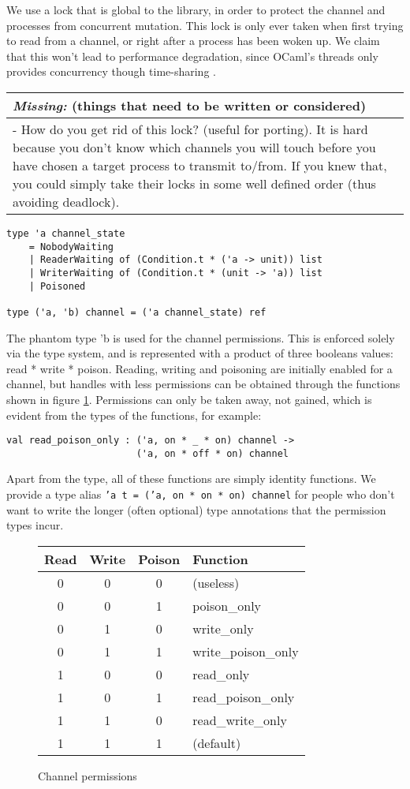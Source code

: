 \documentclass[a4paper,12pt]{article}
\newcommand{\missing}[1]{
\begin{tabular}{|p{11cm}|}
\hline
\emph{Missing:} {\scriptsize (things that need to be written or considered)} \\
\hline
#1
\hline
\end{tabular}
}
\begin{document}
We use a lock that is global to the library, in order to protect the channel and processes from
concurrent mutation. This lock is only ever taken when first trying to read from a channel, or
right after a process has been woken up. We claim that this won't lead to performance degradation,
since OCaml's threads only provides concurrency though time-sharing \cite{ocaml-threads}.

\missing{
- How do you get rid of this lock? (useful for porting). It is hard because you don't know which
channels you will touch before you have chosen a target process to transmit to/from. If you knew
that, you could simply take their locks in some well defined order (thus avoiding deadlock). \\
}

\begin{verbatim}
type 'a channel_state
    = NobodyWaiting 
    | ReaderWaiting of (Condition.t * ('a -> unit)) list
    | WriterWaiting of (Condition.t * (unit -> 'a)) list
    | Poisoned

type ('a, 'b) channel = ('a channel_state) ref
\end{verbatim}

The phantom type 'b is used for the channel permissions. This is enforced solely via the type
system, and is represented with a product of three booleans values: read * write * poison.
Reading, writing and poisoning are initially enabled for a channel, but handles with less 
permissions can be obtained through the functions shown in figure \ref{channel-permissions}. 
Permissions can only be taken away, not gained, which is evident from the types of the 
functions, for example: 

\begin{verbatim}
val read_poison_only : ('a, on * _ * on) channel -> 
                       ('a, on * off * on) channel
\end{verbatim}

Apart from the type, all of these functions are simply identity functions. We provide a
type alias \texttt{'a t = ('a, on * on * on) channel} for people who don't want to write the
longer (often optional) type annotations that the permission types incur.

\begin{figure}[h]
\centering
\begin{tabular}{c|c|c|l}
Read & Write & Poison & Function \\
\hline
0 & 0 & 0 & (useless) \\
0 & 0 & 1 & poison\_only \\
0 & 1 & 0 & write\_only \\
0 & 1 & 1 & write\_poison\_only \\
1 & 0 & 0 & read\_only \\
1 & 0 & 1 & read\_poison\_only \\
1 & 1 & 0 & read\_write\_only \\
1 & 1 & 1 & (default) \\
\end{tabular}
\caption{Channel permissions}
\label{channel-permissions}
\end{figure}
\end{document}
